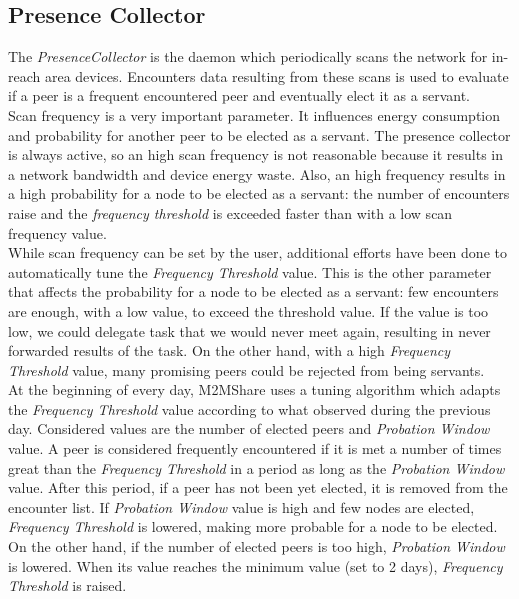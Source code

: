 \subsection{Presence Collector} 
\label{descrPresenceCollector}
The \textit{PresenceCollector} is the daemon which periodically scans the network for in-reach area devices. Encounters data resulting from these scans is used to evaluate if a peer is a frequent encountered peer and eventually elect it as a servant.
\\

Scan frequency is a very important parameter. It influences energy consumption and probability for another peer to be elected as a servant. The presence collector is always active, so an high scan frequency is not reasonable because it results in a network bandwidth and device energy waste. Also, an high frequency results in a high probability for a node to be elected as a servant: the number of encounters raise and the \textit{frequency threshold} is exceeded faster than with a low scan frequency value.
\\

While scan frequency can be set by the user, additional efforts have been done to automatically tune the \textit{Frequency Threshold} value. This is the other parameter that affects the probability  for a node to be elected as a servant: few encounters are enough, with a low value, to exceed the threshold value. If the value is too low, we could delegate task that we would never meet again, resulting in never forwarded results of the task. On the other hand, with a high \textit{Frequency Threshold} value, many promising peers could be rejected from being servants.
\\

At the beginning of every day, M2MShare uses a tuning algorithm which adapts the \textit{Frequency Threshold} value according to what observed during the previous day. Considered values are the number of elected peers and \textit{Probation Window} value. A peer is considered frequently encountered if it is met a number of times great than the \textit{Frequency Threshold} in a period as long as the \textit{Probation Window} value. After this period, if a peer has not been yet elected, it is removed from the encounter list. If \textit{Probation Window} value is high and few nodes are elected, \textit{Frequency Threshold} is lowered, making more probable for a node to be elected. On the other hand, if the number of elected peers is too high, \textit{Probation Window} is lowered. When its value reaches the minimum value (set to 2 days), \textit{Frequency Threshold} is raised.


